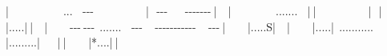 \allowbreak{}|{\mbox{$~$}}{\mbox{$~$}}{\mbox{$~$}}{\mbox{$~$}}{\mbox{$~$}}{\mbox{$~$}}{\mbox{$~$}}{\mbox{$~$}}{\mbox{$~$}}{\mbox{$~$}}{\mbox{$~$}}{\mbox{$~$}}{\mbox{$~$}}{\mbox{$~$}}{\mbox{$~$}}{\mbox{$~$}}{\mbox{$~$}}{\mbox{$~$}}{\mbox{$~$}}{\mbox{$~$}}{\mbox{$~$}}{\mbox{$~$}}...{\mbox{$~$}}{\mbox{$~$}}{\mbox{$~$}}{\mbox{$~$}}-{}-{}-{}{\mbox{$~$}}{\mbox{$~$}}{\mbox{$~$}}{\mbox{$~$}}{\mbox{$~$}}{\mbox{$~$}}{\mbox{$~$}}{\mbox{$~$}}{\mbox{$~$}}{\mbox{$~$}}{\mbox{$~$}}{\mbox{$~$}}{\mbox{$~$}}{\mbox{$~$}}{\mbox{$~$}}{\mbox{$~$}}{\mbox{$~$}}{\mbox{$~$}}{\mbox{$~$}}{\mbox{$~$}}{\mbox{$~$}}\allowbreak{}|{\mbox{$~$}}{\mbox{$~$}}{\mbox{$~$}}-{}-{}-{}{\mbox{$~$}}{\mbox{$~$}}{\mbox{$~$}}{\mbox{$~$}}{\mbox{$~$}}{\mbox{$~$}}{\mbox{$~$}}-{}-{}-{}-{}-{}-{}-{}{\mbox{$~$}}\allowbreak{}|$\text{ }$\newline{}
\allowbreak{}|{\mbox{$~$}}{\mbox{$~$}}{\mbox{$~$}}{\mbox{$~$}}{\mbox{$~$}}{\mbox{$~$}}{\mbox{$~$}}{\mbox{$~$}}{\mbox{$~$}}{\mbox{$~$}}{\mbox{$~$}}{\mbox{$~$}}{\mbox{$~$}}{\mbox{$~$}}{\mbox{$~$}}{\mbox{$~$}}{\mbox{$~$}}{\mbox{$~$}}.......{\mbox{$~$}}{\mbox{$~$}}{\mbox{$~$}}{\mbox{$~$}}\allowbreak{}|{\mbox{$~$}}\allowbreak{}|{\mbox{$~$}}{\mbox{$~$}}{\mbox{$~$}}{\mbox{$~$}}{\mbox{$~$}}{\mbox{$~$}}{\mbox{$~$}}{\mbox{$~$}}{\mbox{$~$}}{\mbox{$~$}}{\mbox{$~$}}{\mbox{$~$}}{\mbox{$~$}}{\mbox{$~$}}{\mbox{$~$}}{\mbox{$~$}}{\mbox{$~$}}{\mbox{$~$}}{\mbox{$~$}}{\mbox{$~$}}{\mbox{$~$}}\allowbreak{}|{\mbox{$~$}}{\mbox{$~$}}{\mbox{$~$}}\allowbreak{}|{\mbox{$~$}}{\mbox{$~$}}{\mbox{$~$}}{\mbox{$~$}}{\mbox{$~$}}{\mbox{$~$}}{\mbox{$~$}}{\mbox{$~$}}{\mbox{$~$}}\allowbreak{}|.....\allowbreak{}|{\mbox{$~$}}\allowbreak{}|$\text{ }$\newline{}
\allowbreak{}|{\mbox{$~$}}{\mbox{$~$}}{\mbox{$~$}}{\mbox{$~$}}{\mbox{$~$}}{\mbox{$~$}}{\mbox{$~$}}{\mbox{$~$}}{\mbox{$~$}}-{}-{}-{}{\mbox{$~$}}-{}-{}-{}{\mbox{$~$}}{\mbox{$~$}}.......{\mbox{$~$}}{\mbox{$~$}}{\mbox{$~$}}{\mbox{$~$}}-{}-{}-{}{\mbox{$~$}}{\mbox{$~$}}{\mbox{$~$}}{\mbox{$~$}}{\mbox{$~$}}-{}-{}-{}-{}-{}-{}-{}-{}-{}-{}-{}{\mbox{$~$}}{\mbox{$~$}}{\mbox{$~$}}{\mbox{$~$}}{\mbox{$~$}}-{}-{}-{}{\mbox{$~$}}\allowbreak{}|{\mbox{$~$}}{\mbox{$~$}}{\mbox{$~$}}{\mbox{$~$}}{\mbox{$~$}}{\mbox{$~$}}{\mbox{$~$}}{\mbox{$~$}}{\mbox{$~$}}\allowbreak{}|.....S\footnotemark[114]\allowbreak{}|$\text{ }$\newline{}
\allowbreak{}|{\mbox{$~$}}{\mbox{$~$}}{\mbox{$~$}}{\mbox{$~$}}{\mbox{$~$}}{\mbox{$~$}}{\mbox{$~$}}{\mbox{$~$}}{\mbox{$~$}}\allowbreak{}|.....\allowbreak{}|{\mbox{$~$}}{\mbox{$~$}}...........{\mbox{$~$}}{\mbox{$~$}}{\mbox{$~$}}{\mbox{$~$}}{\mbox{$~$}}{\mbox{$~$}}{\mbox{$~$}}{\mbox{$~$}}\allowbreak{}|.........\allowbreak{}|{\mbox{$~$}}{\mbox{$~$}}{\mbox{$~$}}{\mbox{$~$}}{\mbox{$~$}}{\mbox{$~$}}{\mbox{$~$}}\allowbreak{}|{\mbox{$~$}}\allowbreak{}|{\mbox{$~$}}{\mbox{$~$}}{\mbox{$~$}}{\mbox{$~$}}{\mbox{$~$}}{\mbox{$~$}}{\mbox{$~$}}{\mbox{$~$}}{\mbox{$~$}}\allowbreak{}|*....\allowbreak{}|{\mbox{$~$}}\allowbreak{}|$\text{ }$\newline{}
